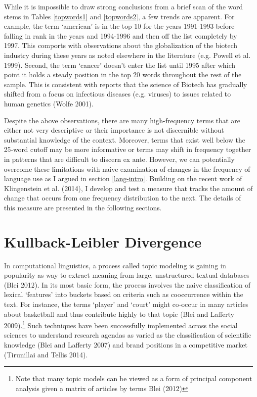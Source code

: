 While it is impossible to draw strong conclusions from a brief scan of the word stems in Tables \ref{topwords1} and \ref{topwords2}, a few trends are apparent. For example, the  term `american' is in the top 10 for the years 1991-1993 before falling in rank in the years and 1994-1996 and then off the list completely by 1997. This comports with observations about the globalization of the biotech industry during these years as noted elsewhere in the literature (e.g. Powell et al. 1999). Second, the term `cancer' doesn't enter the list until 1995 after which point it holds a steady position in the top 20 words throughout the rest of the sample. This is consistent with reports that the science of Biotech has gradually shifted from a focus on infectious diseases (e.g. viruses) to issues related to human genetics (Wolfe 2001).

Despite the above observations, there are many high-frequency terms that are either not very descriptive or their importance is not discernible without substantial knowledge of the context. Moreover, terms that exist well below the 25-word cutoff may be more informative or terms may shift in frequency together in patterns that are difficult to discern ex ante. However, we can potentially overcome these limitations with naive examination of changes in the frequency of language use as I argued in section \ref{lang-intro}. Building on the recent work of Klingenstein et al. (2014), I develop and test a measure that tracks the amount of change that occurs from one frequency distribution to the next. The details of this measure are presented in the following sections.

\section{Kullback-Leibler Divergence}

In computational linguistics, a process called topic modeling is gaining in popularity as way to extract meaning from large, unstructured textual databases (Blei 2012). In its most basic form, the process involves the naive classification of lexical `features' into buckets based on criteria such as cooccurrence within the text. For instance, the terms `player' and `court' might co-occur in many articles about basketball and thus contribute highly to that topic (Blei and Lafferty 2009).\footnote{Note that many topic models can be viewed as a form of principal component analysis given a matrix of articles by terms Blei (2012)} Such techniques have been successfully implemented across the social sciences to understand research agendas as varied as the classification of scientific knowledge (Blei and Lafferty 2007) and brand positions in a competitive market (Tirunillai and Tellis 2014).

